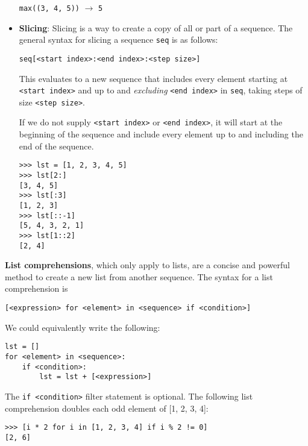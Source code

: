 \begin{itemize}
\lstinline{max((3, 4, 5))} $\rightarrow$ \lstinline{5}

\item \textbf{Slicing}: Slicing is a way to create a copy of all or part of a sequence. The general syntax for slicing a sequence \lstinline{seq} is as follows:
	\begin{lstlisting}
seq[<start index>:<end index>:<step size>]
	\end{lstlisting}

This evaluates to a new sequence that includes every element starting at \lstinline{<start index>} and up to and \textit{excluding} \lstinline{<end index>} in \lstinline{seq}, taking steps of size \lstinline{<step size>}. 

If we do not supply \lstinline{<start index>} or \lstinline{<end index>}, it will start at the beginning of the sequence and include every element up to and including the end of the sequence. 

\begin{lstlisting}
>>> lst = [1, 2, 3, 4, 5]
>>> lst[2:] 
[3, 4, 5]
>>> lst[:3] 
[1, 2, 3]
>>> lst[::-1] 
[5, 4, 3, 2, 1]
>>> lst[1::2] 
[2, 4]
\end{lstlisting}

\end{itemize}
\vspace{0.3 in}
\textbf{List comprehensions}, which only apply to lists, are a concise and powerful method to create a new list from another sequence. The syntax for a list comprehension is
   \begin{lstlisting}
[<expression> for <element> in <sequence> if <condition>]
   \end{lstlisting}

\begin{blocksection}
We could equivalently write the following: 
\begin{lstlisting}
lst = []
for <element> in <sequence>:
    if <condition>:
        lst = lst + [<expression>] 
\end{lstlisting}
\end{blocksection}

\begin{blocksection}
The \lstinline{if <condition>} filter statement is optional. The following list comprehension doubles each odd element of [1, 2, 3, 4]:

\begin{lstlisting}
>>> [i * 2 for i in [1, 2, 3, 4] if i % 2 != 0] 
[2, 6]
\end{lstlisting}
\end{blocksection}

